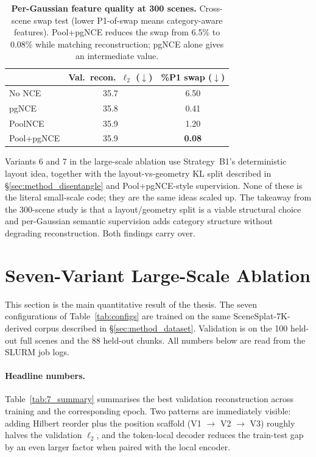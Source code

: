 \begin{table}[h]
  \centering
  \caption[300-scene InfoNCE comparison]{\textbf{Per-Gaussian feature quality at 300 scenes.} Cross-scene swap test (lower P1-of-swap means category-aware features). Pool+pgNCE reduces the swap from 6.5\% to 0.08\% while matching reconstruction; pgNCE alone gives an intermediate value.}
  \label{tab:300_nce}
  {\small
  \begin{tabular}{lcc}
    \toprule
                       & Val.\ recon.\ $\ell_2$ ($\downarrow$) & \%P1 swap ($\downarrow$) \\
    \midrule
    No NCE             & 35.7 & 6.50 \\
    pgNCE              & 35.8 & 0.41 \\
    PoolNCE            & 35.9 & 1.20 \\
    Pool+pgNCE         & 35.9 & \textbf{0.08} \\
    \bottomrule
  \end{tabular}}
\end{table}

Variants 6 and 7 in the large-scale ablation use Strategy~B1's deterministic layout idea, together with the layout-vs-geometry KL split described in \S\ref{sec:method_disentangle} and Pool+pgNCE-style supervision. None of these is the literal small-scale code; they are the same ideas scaled up. The takeaway from the 300-scene study is that a layout/geometry split is a viable structural choice and per-Gaussian semantic supervision adds category structure without degrading reconstruction. Both findings carry over.

\section{Seven-Variant Large-Scale Ablation}
\label{sec:results_7}

This section is the main quantitative result of the thesis. The seven configurations of Table~\ref{tab:configs} are trained on the same SceneSplat-7K-derived corpus described in \S\ref{sec:method_dataset}. Validation is on the 100 held-out full scenes and the 88 held-out chunks. All numbers below are read from the SLURM job logs.

\paragraph{Headline numbers.} Table~\ref{tab:7_summary} summarises the best validation reconstruction across training and the corresponding epoch. Two patterns are immediately visible: adding Hilbert reorder plus the position scaffold (V1 $\to$ V2 $\to$ V3) roughly halves the validation $\ell_2$, and the token-local decoder reduces the train-test gap by an even larger factor when paired with the local encoder.


